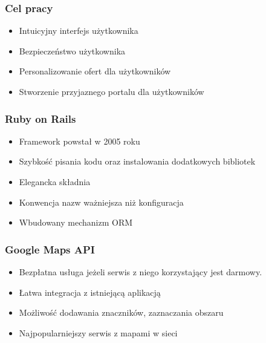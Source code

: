 \documentclass{beamer}
\begin{document}


\begin{frame}
\frametitle{Cel pracy}
\begin{itemize}
\item Intuicyjny interfejs użytkownika
\item Bezpieczeństwo użytkownika
\item Personalizowanie ofert dla użytkowników
\item Stworzenie przyjaznego portalu dla użytkowników
\end{itemize}

\end{frame}


\begin{frame}
\frametitle{Ruby on Rails}
\begin{itemize}
\item Framework powstał w 2005 roku
\item Szybkość pisania kodu oraz instalowania dodatkowych bibliotek
\item Elegancka składnia
\item Konwencja nazw ważniejsza niż konfiguracja
\item Wbudowany mechanizm ORM
\end{itemize}

\end{frame}


\begin{frame}
\frametitle{Google Maps API}
\begin{itemize}
\item Bezpłatna usługa jeżeli serwis z niego korzystający jest darmowy.
\item Łatwa integracja z istniejącą aplikacją
\item Możliwość dodawania znaczników, zaznaczania obszaru
\item Najpopularniejszy serwis z mapami w sieci
\end{itemize}

\end{frame}

\end{document}
